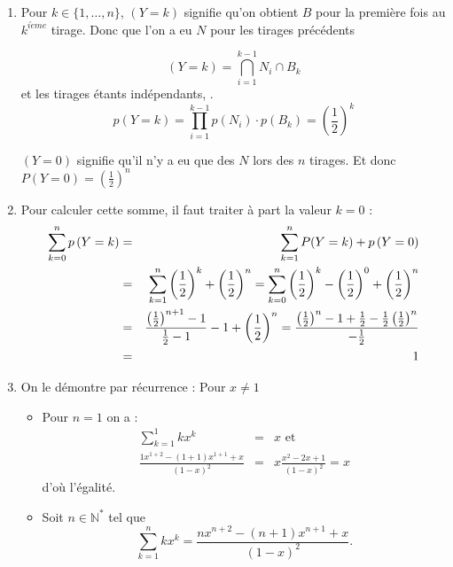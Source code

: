 \begin{correction}
\begin{enumerate}
\item Pour $k\in \{1,\ldots ,n\}$, $\left( Y=k\right) $ signifie qu'on
obtient $B$ pour la premi\`{e}re fois au $k^{i\grave{e}me}$ tirage. Donc que
l'on a eu $N$ pour les tirages pr\'{e}c\'{e}dents

\begin{equation*}
\left( Y=k\right) =\bigcap_{i=1}^{k-1}N_{i}\cap B_{k}
\end{equation*}
et les tirages \'{e}tants ind\'{e}pendants, . 
\begin{equation*}
p\left( Y=k\right) =\prod_{i=1}^{k-1}p\left( N_{i}\right) \cdot p\left(
B_{k}\right) =\left( \frac{1}{2}\right) ^{k}
\end{equation*}

$\left( Y=0\right) $ signifie qu'il n'y a eu que des $N$ lors des $n$
tirages. Et donc $\displaystyle P(Y=0)=\left( \frac{1}{2}\right) ^{n}$

\item Pour calculer cette somme, il faut traiter \`{a} part la valeur $k=0$
: 
\begin{eqnarray*}
\sum_{k=0}^{n}p\left( Y=k\right) &=&\sum_{k=1}^{n}P(Y=k)+p\left( Y=0\right)
\\
&=&\sum_{k=1}^{n}\left( \frac{1}{2}\right) ^{k}+\left( \frac{1}{2}\right)
^{n}=\sum_{k=0}^{n}\left( \frac{1}{2}\right) ^{k}-\left( \frac{1}{2}\right)
^{0}+\left( \frac{1}{2}\right) ^{n} \\
&=&\frac{\left( \frac{1}{2}\right) ^{n+1}-1}{\frac{1}{2}-1}-1+\left( \frac{1%
}{2}\right) ^{n}=\frac{\left( \frac{1}{2}\right) ^{n}-1+\frac{1}{2}-\frac{1}{%
2}\left( \frac{1}{2}\right) ^{n}}{-\frac{1}{2}} \\
&=&1
\end{eqnarray*}

\item On le d\'{e}montre par r\'{e}currence : Pour $x\neq 1$

\begin{itemize}
\item Pour $n=1$ on a : 
\begin{eqnarray*}
\sum_{k=1}^{1}kx^{k} &=&x\mbox{ et } \\
\frac{1x^{1+2}-(1+1)x^{1+1}+x}{(1-x)^{2}} &=&x\frac{x^{2}-2x+1}{(1-x)^{2}}=x
\end{eqnarray*}
d'o\`{u} l'\'{e}galit\'{e}.

\item Soit $n\in \mathbb{N}^{*}$ tel que 
\begin{equation*}
\sum_{k=1}^{n}kx^{k}=\frac{nx^{n+2}-(n+1)x^{n+1}+x}{(1-x)^{2}}.
\end{equation*}


\end{itemize}
\end{enumerate}
\end{correction}
